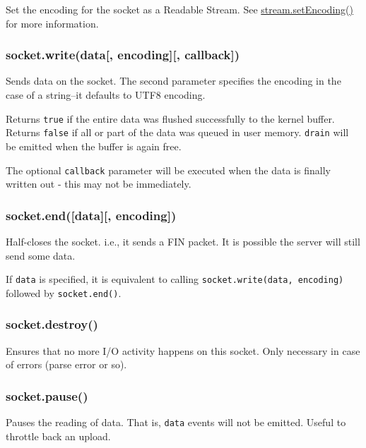 Set the encoding for the socket as a Readable Stream. See
\href{stream.html\#stream_stream_setencoding_encoding}{stream.setEncoding()}
for more information.

\subsubsection{socket.write(data{[}, encoding{]}{[},
callback{]})}\label{socket.writedata-encoding-callback}

Sends data on the socket. The second parameter specifies the encoding in
the case of a string--it defaults to UTF8 encoding.

Returns \texttt{true} if the entire data was flushed successfully to the
kernel buffer. Returns \texttt{false} if all or part of the data was
queued in user memory.
\texttt{\textquotesingle{}drain\textquotesingle{}} will be emitted when
the buffer is again free.

The optional \texttt{callback} parameter will be executed when the data
is finally written out - this may not be immediately.

\subsubsection{socket.end({[}data{]}{[},
encoding{]})}\label{socket.enddata-encoding}

Half-closes the socket. i.e., it sends a FIN packet. It is possible the
server will still send some data.

If \texttt{data} is specified, it is equivalent to calling
\texttt{socket.write(data,\ encoding)} followed by
\texttt{socket.end()}.

\subsubsection{socket.destroy()}\label{socket.destroy}

Ensures that no more I/O activity happens on this socket. Only necessary
in case of errors (parse error or so).

\subsubsection{socket.pause()}\label{socket.pause}

Pauses the reading of data. That is,
\texttt{\textquotesingle{}data\textquotesingle{}} events will not be
emitted. Useful to throttle back an upload.

